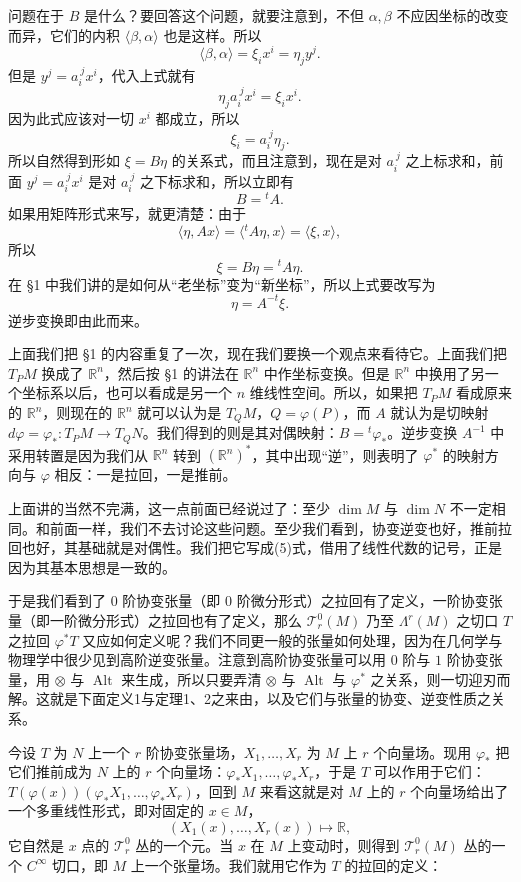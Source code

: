 问题在于 $B$ 是什么？要回答这个问题，就要注意到，不但 $\alpha,\beta$ 不应因坐标的改变而异，它们的内积 $\langle\beta,\alpha\rangle$ 也是这样。所以
\[
 \langle\beta,\alpha\rangle=\xi_ix^i=\eta_jy^j.
\]
但是 $y^j=a_i^{\ j}x^i$，代入上式就有
\[
 \eta_ja_i^{\ j}x^i=\xi_ix^i.
\]
因为此式应该对一切 $x^i$ 都成立，所以
\[
 \xi_i=a_i^{\ j}\eta_j.
\]
所以自然得到形如 $\xi=B\eta$ 的关系式，而且注意到，现在是对 $a_i^{\ j}$ 之上标求和，前面 $y^j=a_i^{\ j}x^i$ 是对 $a_i^{\ j}$ 之下标求和，所以立即有
\[
 B={}^tA.
\]
如果用矩阵形式来写，就更清楚：由于
\[
 \langle\eta,Ax\rangle=\langle{}^tA\eta,x\rangle=\langle\xi,x\rangle,
\]
所以
\[
 \xi=B\eta={}^tA\eta.
\]
在 §1 中我们讲的是如何从“老坐标”变为“新坐标”，所以上式要改写为
\[
 \eta=A^{-t}\xi.
\]
逆步变换即由此而来。

上面我们把 §1 的内容重复了一次，现在我们要换一个观点来看待它。上面我们把 $T_PM$ 换成了 $\mathbb R^n$，然后按 §1 的讲法在 $\mathbb R^n$ 中作坐标变换。但是 $\mathbb R^n$ 中换用了另一个坐标系以后，也可以看成是另一个 $n$ 维线性空间。所以，如果把 $T_PM$ 看成原来的 $\mathbb R^n$，则现在的 $\mathbb R^n$ 就可以认为是 $T_QM$，$Q=\varphi(P)$，而 $A$ 就认为是切映射 $d\varphi=\varphi_*:T_PM\to T_QN$。我们得到的则是其对偶映射：$B={}^t\varphi_*$。逆步变换 $A^{-1}$ 中采用转置是因为我们从 $\mathbb R^n$ 转到 $(\mathbb R^n)^*$，其中出现“逆”，则表明了 $\varphi^*$ 的映射方向与 $\varphi$ 相反：一是拉回，一是推前。

上面讲的当然不完满，这一点前面已经说过了：至少 $\dim M$ 与 $\dim N$ 不一定相同。和前面一样，我们不去讨论这些问题。至少我们看到，协变逆变也好，推前拉回也好，其基础就是对偶性。我们把它写成(5)式，借用了线性代数的记号，正是因为其基本思想是一致的。

于是我们看到了 $0$ 阶协变张量（即 $0$ 阶微分形式）之拉回有了定义，一阶协变张量（即一阶微分形式）之拉回也有了定义，那么 $\mathcal T_r^0(M)$ 乃至 $\Lambda^r(M)$ 之切口 $T$ 之拉回 $\varphi^*T$ 又应如何定义呢？我们不同更一般的张量如何处理，因为在几何学与物理学中很少见到高阶逆变张量。注意到高阶协变张量可以用 $0$ 阶与 $1$ 阶协变张量，用 $\otimes$ 与 $\operatorname{Alt}$ 来生成，所以只要弄清 $\otimes$ 与 $\operatorname{Alt}$ 与 $\varphi^*$ 之关系，则一切迎刃而解。这就是下面定义1与定理1、2之来由，以及它们与张量的协变、逆变性质之关系。

今设 $T$ 为 $N$ 上一个 $r$ 阶协变张量场，$X_1,\ldots,X_r$ 为 $M$ 上 $r$ 个向量场。现用 $\varphi_*$ 把它们推前成为 $N$ 上的 $r$ 个向量场：$\varphi_*X_1,\ldots,\varphi_*X_r$，于是 $T$ 可以作用于它们：$T(\varphi(x))(\varphi_*X_1,\ldots,\varphi_*X_r)$，回到 $M$ 来看这就是对 $M$ 上的 $r$ 个向量场给出了一个多重线性形式，即对固定的 $x\in M$，
\[
 (X_1(x),\ldots,X_r(x))\longmapsto\mathbb R,
\]
它自然是 $x$ 点的 $\mathcal T_r^0$ 丛的一个元。当 $x$ 在 $M$ 上变动时，则得到 $\mathcal T_r^0(M)$ 丛的一个 $C^\infty$ 切口，即 $M$ 上一个张量场。我们就用它作为 $T$ 的拉回的定义：

